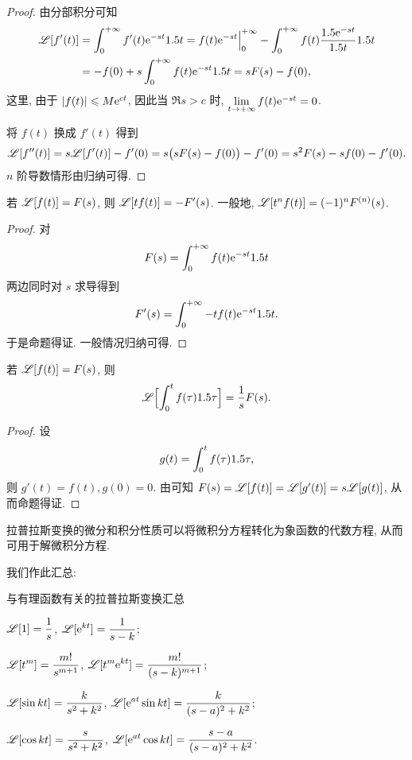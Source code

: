 \begin{proof}
  由分部积分可知
  \begin{align*}
     \mathscr{L}[f'(t)]
    &=\displaystyle\int_0^{+\infty} f'(t)\mathrm{e}^{-st}1.5 t
    =f(t)\mathrm{e}^{-st}\Big|_0^{+\infty}-\displaystyle\int_0^{+\infty} f(t)\frac{1.5 \mathrm{e}^{-st}}{1.5 t}1.5 t\\
    &=-f(0)+s\displaystyle\int_0^{+\infty} f(t)\mathrm{e}^{-st}1.5 t
    =sF(s)-f(0),
  \end{align*}
  这里, 由于 $\lvert f(t)\rvert\leqslant M\mathrm{e}^{ct}$, 因此当 $\Re s>c$ 时, $\lim\limits_{t\rightarrow+\infty} f(t)\mathrm{e}^{-st}=0$.
  
  将 $f(t)$ 换成 $f'(t)$ 得到
  \[
    \mathscr{L}[f''(t)]=s\mathscr{L}[f'(t)]-f'(0)
    =s\bigl(sF(s)-f(0)\bigr)-f'(0)
    =s^2F(s)-sf(0)-f'(0).
  \]
  $n$ 阶导数情形由归纳可得.
\end{proof}

\begin{theorem}[乘多项式性质]
  \label{thm:laplace-multiply-polynomial-property}
  若 $\mathscr{L}[f(t)]=F(s)$, 则 $\mathscr{L}[tf(t)]=-F'(s)$.
  一般地, $\mathscr{L}[t^nf(t)]=(-1)^n F^{(n)}(s)$.
\end{theorem}

\begin{proof}
  对
  \[
    F(s)=\displaystyle\int_0^{+\infty} f(t)\mathrm{e}^{-st}1.5 t
  \]
  两边同时对 $s$ 求导得到
  \[
    F'(s)=\displaystyle\int_0^{+\infty} -tf(t)\mathrm{e}^{-st}1.5 t.
  \]
  于是命题得证. 一般情况归纳可得.
\end{proof}

\begin{theorem}[积分性质]
  \label{thm:laplace-integral-property}
  若 $\mathscr{L}[f(t)]=F(s)$, 则
  \[
    \mathscr{L}\Bigl[\int_0^t f(\tau)1.5\tau\Bigr]
    =\frac1{s}F(s).
  \]
\end{theorem}

\begin{proof}
  设
  \[
    g(t)=\int_0^t f(\tau)1.5 \tau,
  \]
  则 $g'(t)=f(t), g(0)=0$.
  由\thmLDif 可知 $F(s)=\mathscr{L}[f(t)]=\mathscr{L}[g'(t)]=s\mathscr{L}[g(t)]$, 从而命题得证.
\end{proof}

拉普拉斯变换的微分和积分性质可以将微积分方程转化为象函数的代数方程, 从而可用于解微积分方程.

我们作此汇总:
\begin{fifth}{与有理函数有关的拉普拉斯变换汇总}
  \label{page:rational-laplace-transform}
  \begin{enuma}
    \item $\displaystyle\mathscr{L}[1]=\frac1s$, 
    $\displaystyle \mathscr{L}[\mathrm{e}^{kt}]=\frac1{s-k}$;
    \item $\displaystyle\mathscr{L}[t^m]=\frac{m!}{s^{m+1}}$, 
    $\displaystyle\mathscr{L}[t^m\mathrm{e}^{kt}]=\frac{m!}{(s-k)^{m+1}}$;
    \item $\displaystyle\mathscr{L}[\sin kt]=\frac{k}{s^2+k^2}$, 
    $\displaystyle\mathscr{L}[\mathrm{e}^{at}\sin kt]=\frac{k}{(s-a)^2+k^2}$;
    \item $\displaystyle\mathscr{L}[\cos kt]=\frac{s}{s^2+k^2}$,
    $\displaystyle\mathscr{L}[\mathrm{e}^{at}\cos kt]=\frac{s-a}{(s-a)^2+k^2}$.
  \end{enuma}
\end{fifth}

